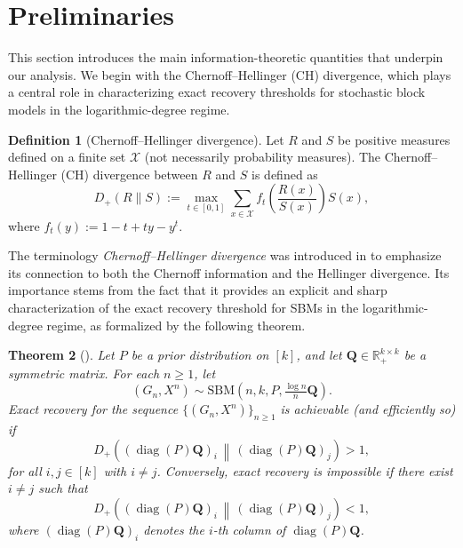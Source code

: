 \documentclass[11pt]{article}
\theoremstyle{plain}
\newtheorem{theorem}{Theorem}[section]
\theoremstyle{definition}
\newtheorem{definition}[theorem]{Definition}
\DeclareMathOperator{\diag}{diag}
\begin{document}
\section{Preliminaries}\label{sec:prelim}

This section introduces the main information-theoretic quantities that underpin our analysis.
We begin with the Chernoff--Hellinger (CH) divergence, which plays a central role in characterizing exact recovery thresholds for stochastic block models in the logarithmic-degree regime.

\begin{definition}[Chernoff--Hellinger divergence]
Let $R$ and $S$ be positive measures defined on a finite set $\mathcal{X}$ (not necessarily probability measures).
The Chernoff--Hellinger (CH) divergence between $R$ and $S$ is defined as
\begin{equation*}\label{CH}
	D_+(R\|S)
	:= \max_{t\in[0,1]} \sum_{x\in \mathcal{X}} f_t\!\left(\frac{R(x)}{S(x)}\right) S(x),
\end{equation*}
where $f_t(y) := 1 - t + ty - y^t$.
\end{definition}

The terminology \emph{Chernoff--Hellinger divergence} was introduced in \citet{abbe015} to emphasize its connection to both the Chernoff information and the Hellinger divergence.
Its importance stems from the fact that it provides an explicit and sharp characterization of the exact recovery threshold for SBMs in the logarithmic-degree regime, as formalized by the following theorem.

\begin{theorem}[\cite{abbe015}]\label{AS15}
Let $P$ be a prior distribution on $[k]$, and let $\mathbf{Q}\in \mathbb{R}_+^{k\times k}$ be a symmetric matrix.
For each $n\ge 1$, let
\[
(G_n,X^n)\sim \mathrm{SBM}\!\left(n,k,P,\tfrac{\log n}{n}\mathbf{Q}\right).
\]
Exact recovery for the sequence $\{(G_n,X^n)\}_{n\ge1}$ is achievable (and efficiently so) if
\begin{equation*}
	D_+\!\left((\diag(P)\mathbf{Q})_i \,\middle\|\, (\diag(P)\mathbf{Q})_j\right) > 1,
\end{equation*}
for all $i,j\in[k]$ with $i\neq j$.
Conversely, exact recovery is impossible if there exist $i\neq j$ such that
\[
	D_+\!\left((\diag(P)\mathbf{Q})_i \,\middle\|\, (\diag(P)\mathbf{Q})_j\right) < 1,
\]
where $(\diag(P)\mathbf{Q})_i$ denotes the $i$-th column of $\diag(P)\mathbf{Q}$.
\end{theorem}
\end{document}
